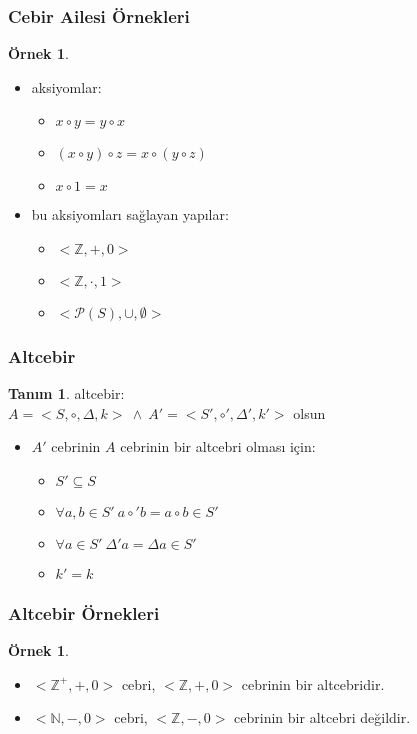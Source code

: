 \documentclass[dvipsnames]{beamer}
\theoremstyle{definition}
\newtheorem{tanim}[theorem]{Tanım}
\theoremstyle{example}
\newtheorem{ornek}[theorem]{Örnek}
\theoremstyle{plain}
\begin{document}
\begin{frame}
  \frametitle{Cebir Ailesi Örnekleri}

  \begin{ornek}
    \begin{itemize}
      \item aksiyomlar:
      \begin{itemize}
        \item $x \circ y = y \circ x$
        \item $(x \circ y) \circ z = x \circ (y \circ z)$
        \item $x \circ 1 = x$
      \end{itemize}

      \pause
      \item bu aksiyomları sağlayan yapılar:
      \begin{itemize}
       \item $<\mathbb{Z},+,0>$
       \item $<\mathbb{Z},\cdot,1>$
       \item $<\mathcal{P}(S),\cup,\emptyset>$
      \end{itemize}
    \end{itemize}
  \end{ornek}
\end{frame}

\begin{frame}
  \frametitle{Altcebir}

  \begin{tanim}
    \alert{altcebir}:\\
    $A = <S,\circ,\Delta,k>~\wedge~A' = <S',\circ',\Delta',k'>$ olsun

    \pause
    \medskip
    \begin{itemize}
      \item $A'$ cebrinin $A$ cebrinin bir altcebri olması için:
      \begin{itemize}
        \item $S' \subseteq S$
        \item $\forall a,b \in S'~a \circ' b = a \circ b \in S'$
        \item $\forall a \in S'~\Delta' a = \Delta a \in S'$
        \item $k' = k$
      \end{itemize}
    \end{itemize}
  \end{tanim}
\end{frame}

\begin{frame}
  \frametitle{Altcebir Örnekleri}

  \begin{ornek}
    \begin{itemize}
      \item $<\mathbb{Z}^+,+,0>$ cebri,
        $<\mathbb{Z},+,0>$ cebrinin bir altcebridir.

      \pause
      \item $<\mathbb{N},-,0>$ cebri,
        $<\mathbb{Z},-,0>$ cebrinin bir altcebri değildir.
    \end{itemize}
  \end{ornek}
\end{frame}
\end{document}
